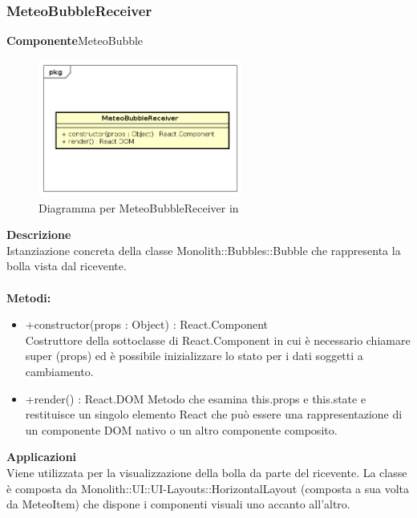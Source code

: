 \clearpage

\subsubsection{MeteoBubbleReceiver}
\textbf{Componente}MeteoBubble\\
   \FloatBarrier
   \begin{figure}[ht]
   \centering
   \includegraphics[width=0.6\textwidth]{img/single-MeteoBubbleReceiver}
   \caption{{Diagramma per MeteoBubbleReceiver in }}
\end{figure}
\FloatBarrier
\textbf{Descrizione}\\
Istanziazione concreta della classe Monolith::Bubbles::Bubble che rappresenta la bolla vista dal ricevente.
\\
\\
\textbf{Metodi:} 
\begin{itemize}
\item +constructor(props : Object) : React.Component 
\\
Costruttore della sottoclasse di React.Component in cui è necessario chiamare super (props) ed è possibile inizializzare lo stato per i dati soggetti a cambiamento.

\item +render() : React.DOM
Metodo che esamina this.props e this.state e restituisce un singolo elemento React che può essere una rappresentazione di un componente DOM nativo o un altro componente composito.

\end{itemize} 


\textbf{Applicazioni}\\
Viene utilizzata per la visualizzazione della bolla da parte del ricevente.
La classe è composta da Monolith::UI::UI-Layouts::HorizontalLayout (composta a sua volta da MeteoItem) che dispone i componenti visuali uno accanto all'altro. 


\clearpage

